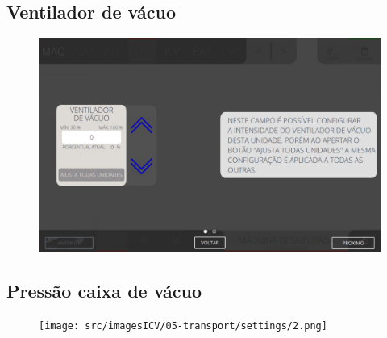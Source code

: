 \thispagestyle{fancy}
\vspace{\fill}
\subsection{Ventilador de vácuo}
\begin{figure}
    \centering
    \includegraphics[width=480 px,height=300 px]{src/imagesICV/05-transport/settings/1.png}
\end{figure}

\newpage
\thispagestyle{fancy}
\vspace{\fill}
\subsection{Pressão caixa de vácuo}
\begin{figure}
    \centering
    \texttt{[image: src/imagesICV/05-transport/settings/2.png]}
\end{figure}

